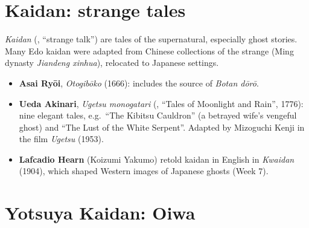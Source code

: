 \begin{center}
\end{center}

\section{Kaidan: strange tales}

\begin{definition}[Kaidan]
\emph{Kaidan} (, ``strange talk'') are tales of the supernatural, especially ghost
stories. Many Edo kaidan were adapted from Chinese collections of the strange (Ming
dynasty \emph{Jiandeng xinhua}), relocated to Japanese settings.
\end{definition}

\begin{itemize}
  \item \textbf{Asai Ryōi}, \emph{Otogibōko} (1666): includes the source of \emph{Botan dōrō}.
  \item \textbf{Ueda Akinari}, \emph{Ugetsu monogatari} (, ``Tales of Moonlight
        and Rain'', 1776): nine elegant tales, e.g.\ ``The Kibitsu Cauldron'' (a betrayed
        wife's vengeful ghost) and ``The Lust of the White Serpent''. Adapted by Mizoguchi
        Kenji in the film \emph{Ugetsu} (1953).
  \item \textbf{Lafcadio Hearn} (Koizumi Yakumo) retold kaidan in English in
        \emph{Kwaidan} (1904), which shaped Western images of Japanese ghosts (Week 7).
\end{itemize}

\section{Yotsuya Kaidan: Oiwa}

